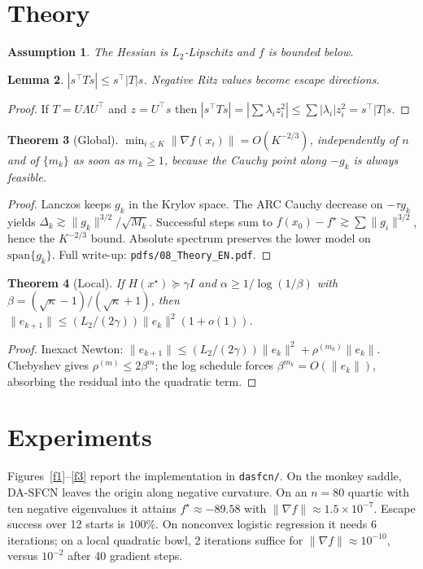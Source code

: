 \documentclass[11pt,a4paper]{article}
\newtheorem{theorem}{Theorem}
\newtheorem{lemma}[theorem]{Lemma}
\newtheorem{assumption}[theorem]{Assumption}
\theoremstyle{definition}
\begin{document}
\section{Theory}
\begin{assumption}
The Hessian is $L_2$-Lipschitz and $f$ is bounded below.
\end{assumption}
\begin{lemma}
$|s^\top T s|\le s^\top |T|s$. Negative Ritz values become escape directions.
\end{lemma}
\begin{proof}
If $T=U\Lambda U^\top$ and $z=U^\top s$ then
$|s^\top T s|=|\sum\lambda_i z_i^2|\le\sum|\lambda_i|z_i^2=s^\top|T|s$.
\end{proof}
\begin{theorem}[Global]
$\min_{i\le K}\|\nabla f(x_i)\|=O(K^{-2/3})$, independently of $n$ and of
$\{m_k\}$ as soon as $m_k\ge 1$, because the Cauchy point along $-g_k$ is
always feasible.
\end{theorem}
\begin{proof}
Lanczos keeps $g_k$ in the Krylov space. The ARC Cauchy decrease on
$-\tau g_k$ yields $\Delta_k\gtrsim\|g_k\|^{3/2}/\sqrt{M_k}$. Successful
steps sum to $f(x_0)-f^\star\gtrsim\sum\|g_i\|^{3/2}$, hence the
$K^{-2/3}$ bound. Absolute spectrum preserves the lower model on
$\mathrm{span}\{g_k\}$. Full write-up: \texttt{pdfs/08\_Theory\_EN.pdf}.
\end{proof}
\begin{theorem}[Local]
If $H(x^\star)\succeq\gamma I$ and $\alpha\ge 1/\log(1/\beta)$ with
$\beta=(\sqrt{\kappa}-1)/(\sqrt{\kappa}+1)$, then
$\|e_{k+1}\|\le (L_2/(2\gamma))\|e_k\|^2(1+o(1))$.
\end{theorem}
\begin{proof}
Inexact Newton:
$\|e_{k+1}\|\le(L_2/(2\gamma))\|e_k\|^2+\rho^{(m_k)}\|e_k\|$.
Chebyshev gives $\rho^{(m)}\le 2\beta^m$; the log schedule forces
$\beta^{m_k}=O(\|e_k\|)$, absorbing the residual into the quadratic term.
\end{proof}

\section{Experiments}
Figures~\ref{f1}--\ref{f3} report the implementation in \texttt{dasfcn/}.
On the monkey saddle, DA-SFCN leaves the origin along negative curvature.
On an $n=80$ quartic with ten negative eigenvalues it attains
$f^\star\approx -89.58$ with $\|\nabla f\|\approx 1.5\times 10^{-7}$.
Escape success over 12 starts is $100\%$. On nonconvex logistic regression
it needs 6 iterations; on a local quadratic bowl, 2 iterations suffice for
$\|\nabla f\|\approx 10^{-10}$, versus $10^{-2}$ after 40 gradient steps.
\end{document}
